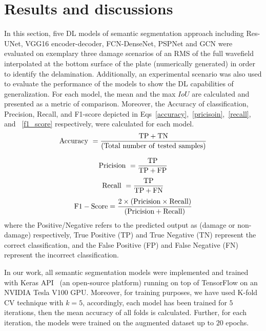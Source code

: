 \section{Results and discussions}
\label{section:results_and_discussions}
In this section, five DL models  of semantic segmentation approach including  Res-UNet, VGG16 encoder-decoder, FCN-DenseNet, PSPNet and GCN were evaluated on exemplary three damage scenarios of an RMS of the full wavefield interpolated at the bottom surface of the plate (numerically generated) in order to identify the delamination.
Additionally, an experimental scenario was also used to evaluate the performance of the models to show the DL capabilities of generalization.
For each model, the mean and the max \(IoU\) are calculated and presented as a metric of comparison.
Moreover, the Accuracy of classification, Precision, Recall, and F1-score depicted in Eqs~\ref{accuracy},~\ref{pricisoin},~\ref{recall}, and ~\ref{f1_score} respectively, were calculated for each model.
\begin{equation}
	\rm Accuracy\ = \frac{TP+TN}{(Total\ number\ of\ tested\ samples)}
	\label{accuracy}
\end{equation}

\begin{equation}
	\rm Pricision\ =\frac{TP}{TP+FP}
	\label{pricisoin}
\end{equation}
\begin{equation}
	\rm Recall\ = \frac{TP}{TP+ FN}
	\label{recall}
\end{equation}
\begin{equation}
	\rm F1-Score =\frac{2 \times (Pricision\times Recall)}{(Pricision + Recall)} 
	\label{f1_score}
\end{equation}
where the Positive/Negative refers to the predicted output as (damage or non-damage) respectively, True Positive (TP) and True Negative (TN)  represent the correct classification, and the False Positive (FP) and False Negative (FN) represent the incorrect classification.

In our work, all semantic segmentation models were implemented and trained with Keras API~\cite{chollet2015keras} (an open-source platform) running on top of TensorFlow on an NVIDIA Tesla V100 GPU. 
Moreover, for training purposes, we have used K-fold CV technique with \(k=5\), accordingly, each model has been trained for \(5\) iterations, then the mean accuracy of all folds is calculated. 
Further, for each iteration, the models were trained on the augmented dataset up to \(20\) epochs.

